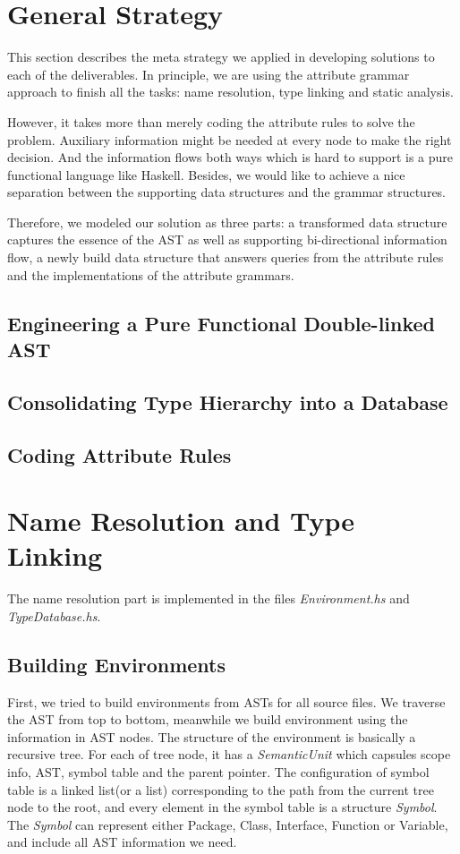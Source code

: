 \documentclass[12pt,letterpaper]{article}
\begin{document}
\section{General Strategy}
This section describes the meta strategy we applied in developing solutions to each of the deliverables. In principle, we are using the attribute grammar approach to finish all the tasks: name resolution, type linking and static analysis.

However, it takes more than merely coding the attribute rules to solve the problem. Auxiliary information might be needed at every node to make the right decision. And the information flows both ways which is hard to support is a pure functional language like Haskell. Besides, we would like to achieve a nice separation between the supporting data structures and the grammar structures.

Therefore, we modeled our solution as three parts: a transformed data structure captures the essence of the AST as well as supporting bi-directional information flow, a newly build data structure that answers queries from the attribute rules and the implementations of the attribute grammars.

\subsection{Engineering a Pure Functional Double-linked AST}

\subsection{Consolidating Type Hierarchy into a Database}

\subsection{Coding Attribute Rules}



\section{Name Resolution and Type Linking}

The name resolution part is implemented in the files \emph{Environment.hs} and \emph{TypeDatabase.hs}.

\subsection{Building Environments}
First, we tried to build environments from ASTs for all source files.
We traverse the AST from top to bottom, meanwhile we build environment using the information in AST nodes.
The structure of the environment is basically a recursive tree.
For each of tree node, it has a \emph{SemanticUnit} which capsules scope info, AST, symbol table and the parent pointer.
The configuration of symbol table is a linked list(or a list) corresponding to the path from the current tree node to the root, and every element in the symbol table is a structure \emph{Symbol}.
The \emph{Symbol} can represent either Package, Class, Interface, Function or Variable, and include all AST information we need.
\end{document}
